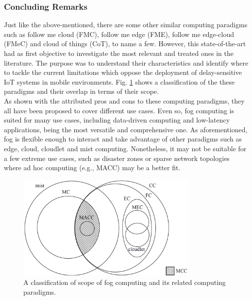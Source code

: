 \subsubsection{Concluding Remarks}
Just like the above-mentioned, there are some other similar computing paradigms such as follow me cloud (FMC), follow me edge (FME), follow me edge-cloud (FMeC) and cloud of things (CoT), to name a few. However, this state-of-the-art had as first objective to investigate the most relevant and treated ones in the literature. The purpose was to understand their characteristics and identify where to tackle the current limitations which oppose the deployment of delay-sensitive IoT systems in mobile environments. Fig. \ref{computing_paradigms} shows a classification of the these paradigms and their overlap in terms of their scope.\\
\noindent\tab As shown with the attributed pros and cons to these computing paradigms, they all have been proposed to cover different use cases. Even so, fog computing is suited for many use cases, including data-driven computing and low-latency applications, being the most versatile and comprehensive one. As aforementioned, fog is flexible enough to interact and take advantage of other paradigms such as edge, cloud, cloudlet and mist computing. Nonetheless, it may not be suitable for a few extreme use cases, such as disaster zones or sparse network topologies where ad hoc computing (e.g., MACC) may be a better fit.
\begin{figure}[t]
	\centering
	\includegraphics[width=90mm]{images/computing_paradigms}
	\caption{A classification of scope of fog computing and its related computing paradigms.\protect\footnotemark}
	\label{computing_paradigms}
\end{figure}

